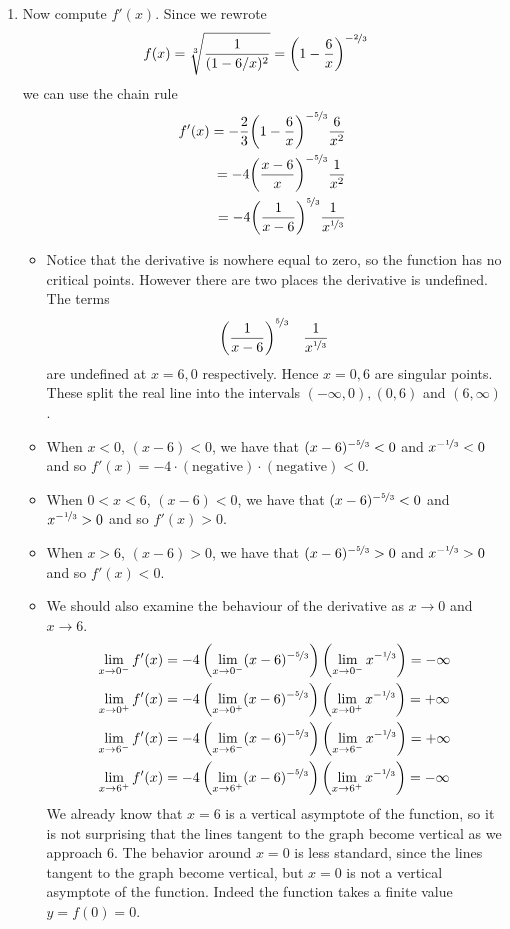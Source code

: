 \begin{eg}[$f(x)=\root{3}\of{\frac{x^2}{(x-6)^2}}\ $]
\begin{enumerate}[(1)]
\item Now compute $f'(x)$. Since we rewrote
\begin{align*}
f(x) &= \root{3}\of{\frac{1}{(1-6/x)^2}}
=\left(1-\frac{6}{x}\right)^{-\nicefrac{2}{3}}
\end{align*}
we can use the chain rule
\begin{align*}
f'(x) =
-\frac{2}{3}{\left(1-\frac{6}{x}\right)}^{-\nicefrac{5}{3}}\frac{6}{x^2}\\
=-4 {\left(\frac{x-6}{x}\right)}^{-\nicefrac{5}{3}}\frac{1}{x^2}\\
=-4 {\left(\frac{1}{x-6}\right)}^{\nicefrac{5}{3}}\frac{1}{x^{\nicefrac{1}{3}}}
\end{align*}
\begin{itemize}
 \item Notice that the derivative is nowhere equal to zero, so the function has
no critical points. However there are two places the derivative is
undefined. The terms
\begin{align*}
  \left(\frac{1}{x-6}\right)^{\nicefrac{5}{3}} && \frac{1}{x^{\nicefrac{1}{3}}}
\end{align*}
are undefined at $x=6,0$ respectively. Hence $x=0,6$ are singular points. These
split the real line into the intervals $(-\infty,0), (0,6)$ and $(6,\infty)$.
\item When $x<0$, $(x-6)<0$, we have that $(x-6)^{-\nicefrac53}<0$ and
$x^{-\nicefrac13}<0$ and so $f'(x)=-4 \cdot
(\text{negative})\cdot(\text{negative}) < 0 $.
\item When $0<x<6$, $(x-6)<0$, we have that $(x-6)^{-\nicefrac53}<0$ and
$x^{-\nicefrac13}>0$ and so $f'(x)>0$.
\item When $x>6$, $(x-6)>0$, we have that $(x-6)^{-\nicefrac53}>0$ and
$x^{-\nicefrac13}>0$ and so $f'(x)<0$.

\item We should also examine the behaviour of the derivative as $x \to 0$ and
$x\to 6$.
\begin{align*}
  \lim_{x \to 0^-} f'(x)
  &= -4
  \left( \lim_{x \to 0^-} (x-6)^{-\nicefrac53} \right)
  \left( \lim_{x \to 0^-} x^{-\nicefrac13} \right)
  = -\infty
\\
  \lim_{x \to 0^+} f'(x)
  &= -4
  \left( \lim_{x \to 0^+} (x-6)^{-\nicefrac53} \right)
  \left( \lim_{x \to 0^+} x^{-\nicefrac13} \right)
  = +\infty
\\
  \lim_{x \to 6^-} f'(x)
  &= -4
  \left( \lim_{x \to 6^-} (x-6)^{-\nicefrac53} \right)
  \left( \lim_{x \to 6^-} x^{-\nicefrac13} \right)
  = +\infty
\\
  \lim_{x \to 6^+} f'(x)
  &= -4
  \left( \lim_{x \to 6^+} (x-6)^{-\nicefrac53} \right)
  \left( \lim_{x \to 6^+} x^{-\nicefrac13} \right)
  = -\infty
\end{align*}
We already know that $x=6$ is a vertical asymptote of the function, so it is
not surprising that the lines tangent to the graph become vertical as we
approach 6. The behavior around $x=0$ is less standard, since the lines tangent
to the graph become vertical, but $x=0$ is not a vertical asymptote of the
function. Indeed the function takes a finite value $y=f(0)=0$.


\end{itemize}
\end{enumerate}
\end{eg}
